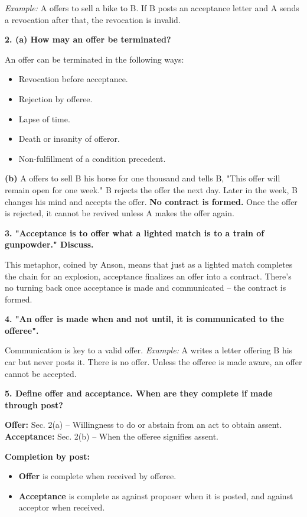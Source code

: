 \documentclass[12pt,a4paper]{book}
\begin{document}
\textit{Example:} A offers to sell a bike to B. If B posts an acceptance letter and A sends a revocation after that, the revocation is invalid.

\vspace{0.5cm}
\textbf{2. (a) How may an offer be terminated?}

An offer can be terminated in the following ways:
\begin{itemize}
    \item Revocation before acceptance.
    \item Rejection by offeree.
    \item Lapse of time.
    \item Death or insanity of offeror.
    \item Non-fulfillment of a condition precedent.
\end{itemize}

\textbf{(b)} A offers to sell B his horse for one thousand and tells B, "This offer will remain open for one week." B rejects the offer the next day. Later in the week, B changes his mind and accepts the offer.  
\textbf{No contract is formed.} Once the offer is rejected, it cannot be revived unless A makes the offer again.

\vspace{0.5cm}
\textbf{3. "Acceptance is to offer what a lighted match is to a train of gunpowder." Discuss.}  

This metaphor, coined by Anson, means that just as a lighted match completes the chain for an explosion, acceptance finalizes an offer into a contract. There’s no turning back once acceptance is made and communicated – the contract is formed.

\vspace{0.5cm}
\textbf{4. "An offer is made when and not until, it is communicated to the offeree".}  

Communication is key to a valid offer.  
\textit{Example:} A writes a letter offering B his car but never posts it. There is no offer.  
Unless the offeree is made aware, an offer cannot be accepted.

\vspace{0.5cm}
\textbf{5. Define offer and acceptance. When are they complete if made through post?}  

\textbf{Offer:} Sec. 2(a) – Willingness to do or abstain from an act to obtain assent.  
\textbf{Acceptance:} Sec. 2(b) – When the offeree signifies assent.

\textbf{Completion by post:}  
\begin{itemize}
    \item \textbf{Offer} is complete when received by offeree.
    \item \textbf{Acceptance} is complete as against proposer when it is posted, and against acceptor when received.
\end{itemize}
\end{document}
